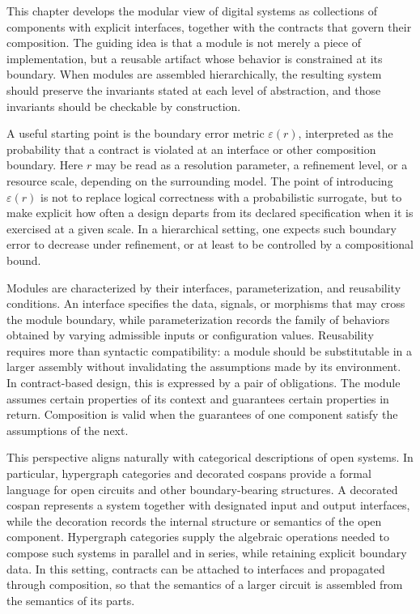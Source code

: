 This chapter develops the modular view of digital systems as collections of components with explicit interfaces, together with the contracts that govern their composition. The guiding idea is that a module is not merely a piece of implementation, but a reusable artifact whose behavior is constrained at its boundary. When modules are assembled hierarchically, the resulting system should preserve the invariants stated at each level of abstraction, and those invariants should be checkable by construction.

A useful starting point is the boundary error metric \(\varepsilon(r)\), interpreted as the probability that a contract is violated at an interface or other composition boundary. Here \(r\) may be read as a resolution parameter, a refinement level, or a resource scale, depending on the surrounding model. The point of introducing \(\varepsilon(r)\) is not to replace logical correctness with a probabilistic surrogate, but to make explicit how often a design departs from its declared specification when it is exercised at a given scale. In a hierarchical setting, one expects such boundary error to decrease under refinement, or at least to be controlled by a compositional bound.

Modules are characterized by their interfaces, parameterization, and reusability conditions. An interface specifies the data, signals, or morphisms that may cross the module boundary, while parameterization records the family of behaviors obtained by varying admissible inputs or configuration values. Reusability requires more than syntactic compatibility: a module should be substitutable in a larger assembly without invalidating the assumptions made by its environment. In contract-based design, this is expressed by a pair of obligations. The module assumes certain properties of its context and guarantees certain properties in return. Composition is valid when the guarantees of one component satisfy the assumptions of the next.

This perspective aligns naturally with categorical descriptions of open systems. In particular, hypergraph categories and decorated cospans provide a formal language for open circuits and other boundary-bearing structures. A decorated cospan represents a system together with designated input and output interfaces, while the decoration records the internal structure or semantics of the open component. Hypergraph categories supply the algebraic operations needed to compose such systems in parallel and in series, while retaining explicit boundary data. In this setting, contracts can be attached to interfaces and propagated through composition, so that the semantics of a larger circuit is assembled from the semantics of its parts.

